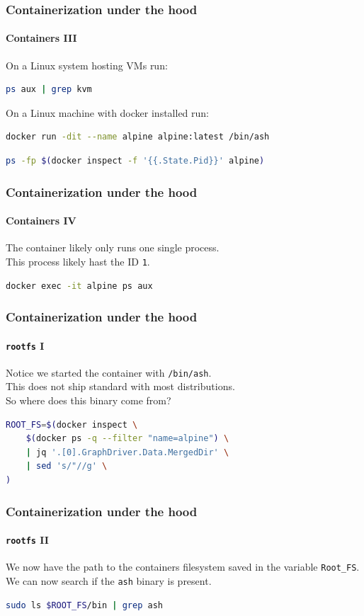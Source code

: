 \begin{frame}[fragile]
    \frametitle{Containerization under the hood}
    \framesubtitle{Containers III}
    On a Linux system hosting VMs run:
    \vspace{0.5cm}
    \begin{lstlisting}[language=bash]
ps aux | grep kvm
    \end{lstlisting}
    \vspace{0.5cm}
    On a Linux machine with docker installed run:
    \vspace{0.5cm}
    \begin{lstlisting}[language=bash]
docker run -dit --name alpine alpine:latest /bin/ash
    \end{lstlisting}
    \begin{lstlisting}[language=bash]
ps -fp $(docker inspect -f '{{.State.Pid}}' alpine)
    \end{lstlisting}
\end{frame}

\begin{frame}[fragile]
    \frametitle{Containerization under the hood}
    \framesubtitle{Containers IV}
    The container likely only runs one single process.\\
    This process likely hast the ID \texttt{1}.
    \vspace{0.5cm}
    \begin{lstlisting}[language=bash]
docker exec -it alpine ps aux
    \end{lstlisting}
\end{frame}

\begin{frame}[fragile]
    \frametitle{Containerization under the hood}
    \framesubtitle{\texttt{rootfs} I}
    Notice we started the container with \texttt{/bin/ash}.\\
    This does not ship standard with most distributions.\\
    So where does this binary come from?
    \vspace{0.5cm}
    \begin{lstlisting}[language=bash]
ROOT_FS=$(docker inspect \
    $(docker ps -q --filter "name=alpine") \
    | jq '.[0].GraphDriver.Data.MergedDir' \
    | sed 's/"//g' \
)
    \end{lstlisting}
\end{frame}

\begin{frame}[fragile]
    \frametitle{Containerization under the hood}
    \framesubtitle{\texttt{rootfs} II}
    We now have the path to the containers filesystem saved in the variable \texttt{Root\_FS}.\\
    We can now search if the \texttt{ash} binary is present.
    \vspace{0.5cm}
    \begin{lstlisting}[language=bash]
sudo ls $ROOT_FS/bin | grep ash
    \end{lstlisting}
\end{frame}

